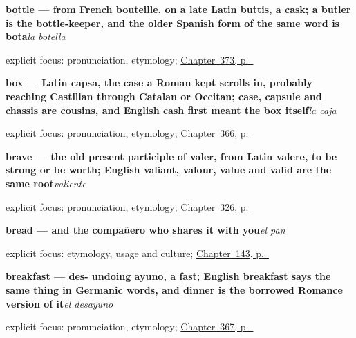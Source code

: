 \noindent\begin{minipage}[t]{\linewidth}
\raggedright
\textbf{bottle — from French bouteille, on a late Latin buttis, a cask; a butler is the bottle-keeper, and the older Spanish form of the same word is bota}\enspace\emph{la botella}\par
\footnotesize explicit focus: pronunciation, etymology; \hyperref[ch:el-oro-y-la-botella]{Chapter~373, p.~\pageref*{ch:el-oro-y-la-botella}}
\end{minipage}\par\smallskip

\noindent\begin{minipage}[t]{\linewidth}
\raggedright
\textbf{box — Latin capsa, the case a Roman kept scrolls in, probably reaching Castilian through Catalan or Occitan; case, capsule and chassis are cousins, and English cash first meant the box itself}\enspace\emph{la caja}\par
\footnotesize explicit focus: pronunciation, etymology; \hyperref[ch:la-caja-y-la-lampara]{Chapter~366, p.~\pageref*{ch:la-caja-y-la-lampara}}
\end{minipage}\par\smallskip

\noindent\begin{minipage}[t]{\linewidth}
\raggedright
\textbf{brave — the old present participle of valer, from Latin valere, to be strong or be worth; English valiant, valour, value and valid are the same root}\enspace\emph{valiente}\par
\footnotesize explicit focus: pronunciation, etymology; \hyperref[ch:nervioso-y-listo]{Chapter~326, p.~\pageref*{ch:nervioso-y-listo}}
\end{minipage}\par\smallskip

\noindent\begin{minipage}[t]{\linewidth}
\raggedright
\textbf{bread — and the compañero who shares it with you}\enspace\emph{el pan}\par
\footnotesize explicit focus: etymology, usage and culture; \hyperref[ch:spanish-water-wine-bread]{Chapter~143, p.~\pageref*{ch:spanish-water-wine-bread}}
\end{minipage}\par\smallskip

\noindent\begin{minipage}[t]{\linewidth}
\raggedright
\textbf{breakfast — des- undoing ayuno, a fast; English breakfast says the same thing in Germanic words, and dinner is the borrowed Romance version of it}\enspace\emph{el desayuno}\par
\footnotesize explicit focus: pronunciation, etymology; \hyperref[ch:el-desayuno-y-la-fruta]{Chapter~367, p.~\pageref*{ch:el-desayuno-y-la-fruta}}
\end{minipage}\par\smallskip

